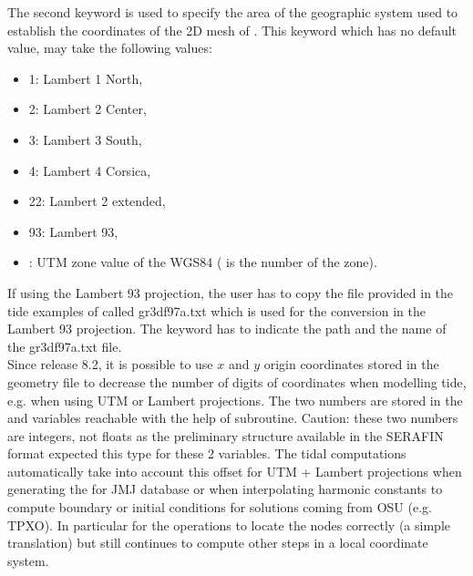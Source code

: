 The second keyword is used to specify the area of the geographic system used
to establish the coordinates of the 2D mesh of .
This keyword  which has no default
value, may take the following values:

\begin{itemize}
\item 1: Lambert 1 North,

\item 2: Lambert 2 Center,

\item 3: Lambert 3 South,

\item 4: Lambert 4 Corsica,

\item 22: Lambert 2 extended,

\item 93: Lambert 93,

\item {}: UTM zone value of the WGS84 (
is the number of the zone).
\end{itemize}

If using the Lambert 93 projection, the user has to copy the file provided
in the tide examples of  called gr3df97a.txt which is used
for the conversion in the Lambert 93 projection.
The keyword  has to indicate the path
and the name of the gr3df97a.txt file.
\\

Since release 8.2, it is possible to use $x$ and $y$ origin coordinates stored
in the geometry file to decrease the number of digits of coordinates
when modelling tide, e.g. when using UTM or Lambert projections.
The two numbers are stored in the  and 
variables reachable with the help of  subroutine.
Caution: these two numbers are integers, not floats as the preliminary structure
available in the SERAFIN format expected this type for these 2 variables.
The tidal computations automatically take into account this offset for
UTM + Lambert projections when generating the 
for JMJ database or when interpolating harmonic constants to compute boundary
or initial conditions for solutions coming from OSU (e.g. TPXO).
In particular for the operations to locate the nodes correctly (a simple
translation) but  still continues to compute other steps in a local
coordinate system.

